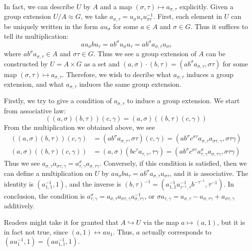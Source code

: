 \begin{analysis}
    In fact, we can describe $U$ by $A$ and a map $(\sigma,\tau)\mapsto a_{\sigma,\tau}$ explicitly. Given a group extension $U/A\approx G$, we take $a_{\sigma,\tau}=u_\sigma u_\tau u_{\sigma\tau}^{-1}$. First, each element in $U$ can be uniquely written in the form $au_\sigma$ for some $a\in A$ and $\sigma\in G$. Thus it suffices to tell its multiplication: \[ au_\sigma bu_\tau=ab^\sigma u_\sigma u_\tau=ab^\sigma a_{\sigma,\tau}u_{\sigma\tau} \] where $ab^\sigma a_{\sigma,\tau}\in A$ and $\sigma\tau\in G$. Thus we see a group extension of $A$ can be constructed by $U=A\times G$ as a set and $(a,\sigma)\cdot(b,\tau)=(ab^\sigma a_{\sigma,\tau},\sigma\tau)$ for some map $(\sigma,\tau)\mapsto a_{\sigma,\tau}$. Therefore, we wish to decribe what $a_{\sigma,\tau}$ induces a group extension, and what $a_{\sigma,\tau}$ induces the same group extension.

    Firstly, we try to give a condition of $a_{\sigma,\tau}$ to induce a group extension. We start from associative law: \[ ((a,\sigma)(b,\tau))(c,\gamma)=(a,\sigma)((b,\tau)(c,\gamma)) \] From the multiplication we obtained above, we see \begin{align*} ((a,\sigma)(b,\tau))(c,\gamma)&=(ab^\sigma a_{\sigma,\tau},\sigma\tau)(c,\gamma)=(ab^\sigma c^{\sigma\tau}a_{\sigma,\tau}a_{\sigma\tau,\gamma},\sigma\tau\gamma) \\ (a,\sigma)((b,\tau)(c,\gamma))&=(a,\sigma)(bc^\tau a_{\tau,\gamma},\tau\gamma)=(ab^\sigma c^{\sigma\tau}a_{\tau,\gamma}^\sigma a_{\sigma,\tau\gamma},\sigma\tau\gamma) \end{align*} Thus we see $a_{\sigma,\tau}a_{\sigma\tau,\gamma}=a_{\tau,\gamma}^\sigma a_{\sigma,\tau\gamma}$. Conversely, if this condition is satisfied, then we can define a multiplication on $U$ by $au_\sigma bu_\tau=ab^\sigma a_{\sigma,\tau}u_{\sigma\tau}$, and it is associative. The identity is $(a_{1,1}^{-1},1)$, and the inverse is $(b,\tau)^{-1}=(a_{1,1}^{-1}a_{\tau^{-1},\tau}^{-1}b^{-\tau^{-1}},\tau^{-1})$. In conclusion, the condition is $a_{\tau,\gamma}^\sigma=a_{\sigma,\tau}a_{\sigma\tau,\gamma}a_{\sigma,\tau\gamma}^{-1}$, or $\sigma a_{\tau,\gamma}=a_{\sigma,\tau}-a_{\sigma,\tau\gamma}+a_{\sigma\tau,\gamma}$ additively.
\end{analysis}

\begin{remark}
    Readers might take it for granted that $A\hookrightarrow U$ via the map $a\mapsto(a,1)$, but it is in fact not true, since $(a,1)\leftrightarrow au_1$. Thus, $a$ actually corresponds to $(au_1^{-1},1)=(aa_{1,1}^{-1},1)$.
\end{remark}

